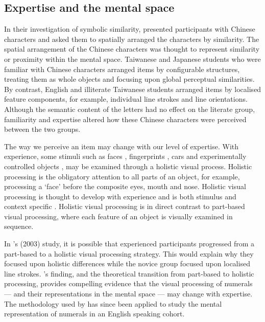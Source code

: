 \subsection{Expertise and the mental space}
In their investigation of symbolic similarity,  presented participants with Chinese characters and asked them to spatially arranged the characters by similarity. The spatial arrangement of the Chinese characters was thought to represent similarity or proximity within the mental space. Taiwanese and Japanese students who were familiar with Chinese characters arranged items by configurable structures, treating them as whole objects and focusing upon global perceptual similarities. By contrast, English and illiterate Taiwanese students arranged items by localised feature components, for example, individual line strokes and line orientations. Although the semantic content of the letters had no effect on the literate group, familiarity and expertise altered how these Chinese characters were perceived between the two groups. 

The way we perceive an item may change with our level of expertise. With experience, some stimuli such as faces \cite{taubert2011role}, fingerprints \cite{busey2005behavioral}, cars \cite{gauthier2003perceptual} and experimentally controlled objects \cite{chua2019domain}, may be examined through a holistic visual process. Holistic processing is the obligatory attention to all parts of an object, for example, processing a ‘face’ before the composite eyes, mouth and nose. Holistic visual processing is thought to develop with experience and is both stimulus and context specific \cite{chua2019domain}. Holistic visual processing is in direct contrast to part-based visual processing, where each feature of an object is visually examined in sequence. 

In \citeauthor{yeh2003role}'s (2003) study, it is possible that experienced participants progressed from a part-based to a holistic visual processing strategy. This would explain why they focused upon holistic differences while the novice group focused upon localised line strokes. \citeauthor{yeh2003role}'s finding, and the theoretical transition from part-based to holistic processing, provides compelling evidence that the visual processing of numerals --- and their representations in the mental space --- may change with expertise. The methodology used by \citeauthor{yeh2003role} has since been applied to study the mental representation of numerals in an English speaking cohort.

